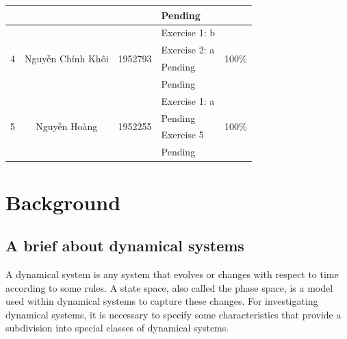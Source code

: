 \documentclass[a4paper]{article}
\begin{document}
\begin{center}
\begin{tabular}{|c|c|c|l|c|}
                        &                                        &                          & \textendash{} Pending          &                             \\
    \hline
    \multirow{4}{*}{4}  & \multirow{4}{*}{Nguyễn Chính Khôi}     & \multirow{4}{*}{1952793} & \textendash{} Exercise 1: b    & \multirow{4}{*}{100\%}      \\
                        &                                        &                          & \textendash{} Exercise 2: a    &                             \\
                        &                                        &                          & \textendash{} Pending          &                             \\
                        &                                        &                          & \textendash{} Pending          &                             \\
    \hline
    \multirow{4}{*}{5}  & \multirow{4}{*}{Nguyễn Hoàng}          & \multirow{4}{*}{1952255} & \textendash{} Exercise 1: a    & \multirow{4}{*}{100\%}      \\
                        &                                        &                          & \textendash{} Pending          &                             \\
                        &                                        &                          & \textendash{} Exercise 5       &                             \\
                        &                                        &                          & \textendash{} Pending          &                             \\
    \hline
  \end{tabular}
\end{center}


\newpage
\section{Background}
\subsection{A brief about dynamical systems}
A dynamical system is any system that evolves or changes with respect to time according to some rules.
A state space, also called the phase space, is a model used within dynamical systems to capture these changes.
For investigating dynamical systems, it is necessary to specify some characteristics that provide a subdivision into special classes of dynamical systems.
\end{document}
